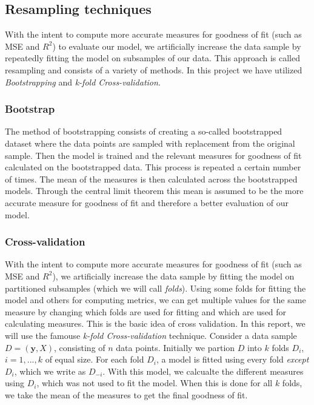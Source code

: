 \documentclass[twocolumn,english,notitlepage]{article}
\renewcommand{\vec}[1]{\boldsymbol{#1}}
\begin{document}
    \subsection{Resampling techniques}
    With the intent to compute more accurate measures for goodness of fit (such as MSE and $R^2$) to evaluate our model, we 
    artificially increase the data sample by repeatedly fitting the model on subsamples of our data. This approach is called resampling and consists of a variety of methods. In this project we have utilized \textit{Bootstrapping} and \textit{k-fold Cross-validation}. 

        \subsubsection*{Bootstrap}
        The method of bootstrapping consists of creating a so-called bootstrapped dataset where the data points are sampled with replacement from the original sample. Then the model is trained and the relevant measures for goodness of fit calculated on the bootstrapped data. This process is repeated a certain number of times. The mean of the measures is then calculated across the bootstrapped models. Through the central limit theorem this mean is assumed to be the more accurate measure for goodness of fit and therefore a better evaluation of our model.  

        \subsubsection*{Cross-validation}
        With the intent to compute more accurate measures for goodness of fit (such as MSE and $R^2$), we 
        artificially increase the data sample by fitting the model on partitioned subsamples (which we will call \textit{folds}). Using some folds
        for fitting the model and others for computing metrics, we can get multiple values for the same measure by changing which folds are used for fitting 
        and which are used for calculating measures. This is the basic idea of cross validation.
        \newline\newline
        In this report, we will use the famouse \textit{k-fold Cross-validation} technique. Consider a data sample $D = (\vec{y}, X)$, consisting of $n$ data points. Initially we partion $D$ into $k$ folds $D_i$, $i = 1, ... , k$ of equal size.   
        For each fold $D_i$, a model is fitted using every fold \textit{except} $D_i$, which we write as $D_{-i}$. With this model, we calcualte the different measures 
        using $D_i$, which was not used to fit the model. When this is done for all $k$ folds, we take the mean of the measures to get the 
        final goodness of fit. 
\end{document}
